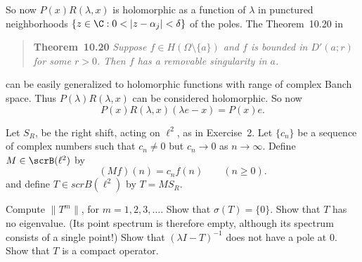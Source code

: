 \begin{enumerate}
So now \(P(x)R(\lambda,x)\) is holomorphic as a function of \(\lambda\)
in punctured neighborhoods \(\{z\in\C: 0 < |z - \alpha_j| < \delta\}\)
of the poles. The Theorem~10.20 in \cite{RudinRCA80}
\begin{quote}
\textbf{Theorem~10.20}
\textit{
Suppose \(f\in H(\Omega\setminus\{a\})\) and $f$ is bounded in \(D'(a;r)\)
for some \(r > 0\). Then $f$ has a removable singularity in $a$.
}
\end{quote}
can be easily
generalized to holomorphic functions with range of complex Banch space.
Thus \(P(\lambda) R(\lambda,x)\) can be considered holomorphic.
So now
\begin{equation*}
P(x)R(\lambda,x)(\lambda e - x) = P(x)e.
\end{equation*}


\unfinished

\begin{excopy}
Let \(S_R\), be the right shift, acting on \(\ell^2\),
as in Exercise~2. Let \(\{c_n\}\) be a sequence of
complex numbers such that \(c_n \neq 0\) but \(c_n\to 0\) as \(n\to\infty\).
 Define \(M \in \scrB(\ell^2)\) by
\begin{equation*}
(Mf)(n) = c_n f(n) \qquad (n \geq 0).
\end{equation*}
and define \(T \in scrB(\ell^2)\) by \(T = MS_R\).
\begin{itemize}
 Compute \(\|T^m\|\), for \(m = 1,2,3,\ldots\).
 Show that \(\sigma(T) = \{0\}\).
 Show that $T$ has no eigenvalue.
  (Its point spectrum is therefore empty,
  although its spectrum consists of a single point!)
 Show that \((\lambda I - T)^{-1}\) does not have a pole at $0$.
 Show that $T$ is a compact operator.
\end{itemize}
\end{excopy}


\end{enumerate}
